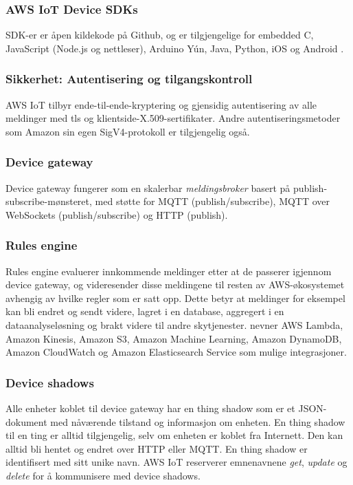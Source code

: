 \subsubsection{AWS IoT Device SDKs}
SDK-er er åpen kildekode på Github, og er tilgjengelige for embedded C, JavaScript (Node.js og nettleser),
Arduino Yún, Java, Python, iOS og Android \citep{aws_sdks}.

\subsubsection{Sikkerhet: Autentisering og tilgangskontroll}
AWS IoT tilbyr ende-til-ende-kryptering og gjensidig autentisering av alle meldinger med
\gls{tls} og klientside-X.509-sertifikater. Andre autentiseringsmetoder som Amazon sin egen SigV4-protokoll
er tilgjengelig også.

\subsubsection{Device gateway}
Device gateway fungerer som en skalerbar \textit{meldingsbroker} basert på publish-subscribe-mønsteret,
med støtte for MQTT (publish/subscribe), MQTT over WebSockets (publish/subscribe) og HTTP (publish).

\subsubsection{Rules engine}
Rules engine evaluerer innkommende meldinger etter at de passerer igjennom device gateway,
og videresender disse meldingene til resten av AWS-økosystemet avhengig av hvilke regler som er satt opp.
Dette betyr at meldinger for eksempel kan bli endret og sendt videre, lagret i en database, aggregert i en
dataanalyseløsning og brakt videre til andre skytjenester. \citet{aws_works} nevner AWS Lambda, Amazon Kinesis,
Amazon S3, Amazon Machine Learning, Amazon DynamoDB, Amazon CloudWatch og Amazon Elasticsearch Service som mulige
integrasjoner.

\subsubsection{Device shadows}
Alle enheter koblet til device gateway har en thing shadow som er et JSON-dokument
med nåværende tilstand og informasjon om enheten. En thing shadow til en ting er alltid tilgjengelig,
selv om enheten er koblet fra Internett. Den kan alltid bli hentet og endret over HTTP eller MQTT. En thing shadow
er identifisert med sitt unike navn. AWS IoT reserverer emnenavnene \textit{get}, \textit{update}
og \textit{delete} for å kommunisere med device shadows.

